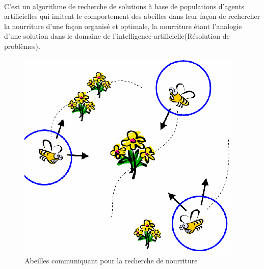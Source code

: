 		\paragraph{} 
		C'est un algorithme de recherche de solutions à base de populations d'agents artificielles qui imitent le comportement des abeilles dans leur façon de rechercher la nourriture d'une façon organisé et optimale, la nourriture étant l'analogie d'une solution dans le domaine de l'intelligence artificielle(Résolution de problèmes).
		\begin{figure}[H]
			\centering
			\includegraphics{images/beesSearching.png}
			\caption{Abeilles communiquant pour la recherche de nourriture}
		\end{figure}
		
		